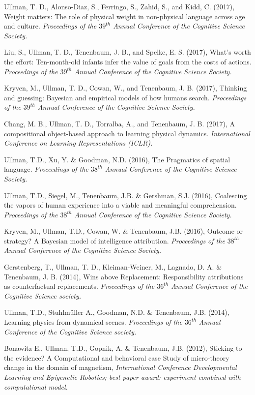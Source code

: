 \documentclass[margin,line,pifont,palatino,courier]{res}
\begin{document}
\begin{resume}
Ullman, T. D., Alonso-Diaz, S., Ferringo, S., Zahid, S., and Kidd, C. (2017), Weight matters: The role of physical weight in non-physical language across age and culture. \textit{Proceedings of the $39^{th}$ Annual Conference of the Cognitive Science Society.}

Liu, S., Ullman, T. D., Tenenbaum, J. B., and Spelke, E. S. (2017), What's worth the effort: Ten-month-old infants infer the value of goals from the costs of actions. \textit{Proceedings of the $39^{th}$ Annual Conference of the Cognitive Science Society.}

Kryven, M., Ullman, T. D., Cowan, W., and Tenenbaum, J. B. (2017), Thinking and guessing: Bayesian and empirical models of how humans search. \textit{Proceedings of the $39^{th}$ Annual Conference of the Cognitive Science Society.}

Chang, M. B., Ullman, T. D., Torralba, A., and Tenenbaum, J. B. (2017), A compositional object-based approach to learning physical dynamics. \textit{International Conference on Learning Representations (ICLR).}

Ullman, T.D., Xu, Y. \& Goodman, N.D. (2016), The Pragmatics of spatial language. \textit{Proceedings of the $38^{th}$ Annual Conference of the Cognitive Science Society.}

Ullman, T.D., Siegel, M., Tenenbaum, J.B. \& Gershman, S.J. (2016), Coalescing the vapors of human experience into a viable and meaningful comprehension. \textit{Proceedings of the $38^{th}$ Annual Conference of the Cognitive Science Society.}

Kryven, M., Ullman, T.D., Cowan, W. \& Tenenbaum, J.B. (2016), Outcome or strategy? A Bayesian model of intelligence attribution. \textit{Proceedings of the $38^{th}$ Annual Conference of the Cognitive Science Society.}

Gerstenberg, T., Ullman, T. D., Kleiman-Weiner, M., Lagnado, D. A. \& Tenenbaum, J. B. (2014), Wins above Replacement: Responsibility attributions as counterfactual replacements. \textit{Proceedings of the $36^{th}$ Annual Conference of the Cognitive Science society.}

Ullman, T.D., Stuhlm{\"u}ller A., Goodman, N.D. \& Tenenbaum, J.B. (2014), Learning physics from dynamical scenes. \textit{Proceedings of the $36^{th}$ Annual Conference of the Cognitive Science society.}

Bonawitz E., Ullman, T.D., Gopnik, A. \& Tenenbaum, J.B. (2012), Sticking to the evidence? A Computational and behavioral case Study of micro-theory change in the domain of magnetism, \textit{International Conference Developmental Learning and Epigenetic Robotics; best paper award: experiment combined with computational model.}


\end{resume}
\end{document}
